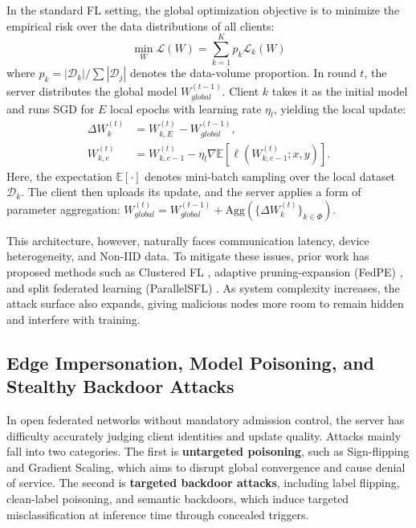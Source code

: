 \documentclass[final,5p,times,twocolumn]{elsarticle/elsarticle}
\begin{document}
In the standard FL setting, the global optimization objective is to minimize the empirical risk over the data distributions of all clients:
\begin{equation}
    \min_{W} \mathcal{L}(W) = \sum_{k=1}^K p_k \mathcal{L}_k(W)
\end{equation}
where $p_k = |\mathcal{D}_k| / \sum |\mathcal{D}_j|$ denotes the data-volume proportion. In round $t$, the server distributes the global model $W_{global}^{(t-1)}$. Client $k$ takes it as the initial model and runs SGD for $E$ local epochs with learning rate $\eta_l$, yielding the local update:
\begin{equation}
    \begin{aligned}
        \Delta W_{k}^{(t)} & = W_{k, E}^{(t)} - W_{global}^{(t-1)}, \\
        W_{k, e}^{(t)}     & = W_{k, e-1}^{(t)}
        - \eta_l \nabla \mathbb{E}[\ell(W_{k, e-1}^{(t)}; x, y)] .
    \end{aligned}
\end{equation}
Here, the expectation $\mathbb{E}[\cdot]$ denotes mini-batch sampling over the local dataset $\mathcal{D}_k$. The client then uploads its update, and the server applies a form of parameter aggregation: $W_{global}^{(t)} = W_{global}^{(t-1)} + \mathrm{Agg}(\{ \Delta W_{k}^{(t)} \}_{k\in\Phi})$.

This architecture, however, naturally faces communication latency, device heterogeneity, and Non-IID data. To mitigate these issues, prior work has proposed methods such as Clustered FL \cite{r9_clustered}, adaptive pruning-expansion (FedPE) \cite{fedpe}, and split federated learning (ParallelSFL) \cite{parallelsfl}. As system complexity increases, the attack surface also expands, giving malicious nodes more room to remain hidden and interfere with training.

\subsection{Edge Impersonation, Model Poisoning, and Stealthy Backdoor Attacks}
In open federated networks without mandatory admission control, the server has difficulty accurately judging client identities and update quality. Attacks mainly fall into two categories. The first is \textbf{untargeted poisoning}, such as Sign-flipping and Gradient Scaling, which aims to disrupt global convergence and cause denial of service. The second is \textbf{targeted backdoor attacks}, including label flipping, clean-label poisoning, and semantic backdoors, which induce targeted misclassification at inference time through concealed triggers.
\end{document}
